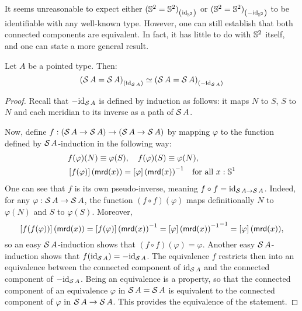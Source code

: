 \documentclass[english,a4]{article}
\renewcommand{\ap}[1]{\left[{#1}\right]}
\begin{document}
It seems unreasonable to expect either ${({{\mathbb S^{2}}} = {{\mathbb S^{2}}})}_{\left(\mathord{\mathrm{id}}_{{\mathbb S^{2}}}\right)}$ or
${({{\mathbb S^{2}}} = {{\mathbb S^{2}}})}_{\left(-\mathord{\mathrm{id}}_{{\mathbb S^{2}}}\right)}$ to be identifiable with any well-known type.
However, one can still establish that both connected components are equivalent.
In fact, it has little to do with ${{\mathbb S^{2}}}$ itself, and one can state a more
general result.
\begin{proposition} \label{prop:equiv-susp-comp}
  Let $A$ be a pointed type. Then:
  \begin{displaymath}
    {(\operatorname{\mathcal S}A = \operatorname{\mathcal S}A)}_{\left(\mathord{\mathrm{id}}_{\operatorname{\mathcal S} A}\right)} \simeq {(\operatorname{\mathcal S}A = \operatorname{\mathcal S}A)}_{\left(-\mathord{\mathrm{id}}_{\operatorname{\mathcal S} A}\right)}
  \end{displaymath}
  \label{prop:sups-components-are-equiv}
\end{proposition}
\begin{proof}
  Recall that $-\mathord{\mathrm{id}}_{\operatorname{\mathcal S} A}$ is defined by induction as follows: it maps $N$
  to $S$, $S$ to $N$ and each meridian to its inverse as a path of $\operatorname{\mathcal S} A$.

  Now, define $f:{({\operatorname{\mathcal S} A} \to {\operatorname{\mathcal S}A})} \to ({\operatorname{\mathcal S} A} \to {\operatorname{\mathcal S}A})$ by mapping
  $\varphi$ to the function defined by ${\operatorname{\mathcal S} A}$-induction in the following way:
  \begin{align*}
    &f(\varphi)(N) \jdeq \varphi(S), \quad f(\varphi)(S) \jdeq \varphi(N),\\
    &\ap{f(\varphi)}(\mrd(x)) = \inv{\ap{\varphi}(\mrd(x))}\quad \text{for all}\ x:\Sc
  \end{align*}
  One can see that $f$ is its own pseudo-inverse, meaning $f\circ f = \mathord{\mathrm{id}}_{{\operatorname{\mathcal S} A}
  \to {\operatorname{\mathcal S}A}}$. Indeed, for any $\varphi:{\operatorname{\mathcal S} A} \to {\operatorname{\mathcal S}A}$, the function $(f\circ
  f)(\varphi)$ maps definitionally $N$ to $\varphi(N)$ and $S$ to $\varphi(S)$.
  Moreover, 
  \[
  \ap{f(f(\varphi))}(\mrd(x)) = \inv{\ap{f(\varphi)}(\mrd(x))}
  = \inv{\inv{\ap{\varphi}(\mrd(x))}} = \ap{\varphi}(\mrd(x)),
  \]
  so an easy ${\operatorname{\mathcal S} A}$-induction shows that $(f\circ f)(\varphi) = \varphi$.
  Another easy ${\operatorname{\mathcal S} A}$-induction shows that $f(\mathord{\mathrm{id}}_{\operatorname{\mathcal S} A}) = -\mathord{\mathrm{id}}_{\operatorname{\mathcal S} A}$.
  The equivalence $f$ restricts then into an equivalence between the connected
  component of $\mathord{\mathrm{id}}_{\operatorname{\mathcal S} A}$ and the connected component of $-\mathord{\mathrm{id}}_{\operatorname{\mathcal S} A}$. 
  Being an equivalence is a property, so that the connected component of an
  equivalence $\varphi$ in $\operatorname{\mathcal S} A = \operatorname{\mathcal S} A$ is equivalent to the connected
  component of $\varphi$ in ${\operatorname{\mathcal S} A} \to {\operatorname{\mathcal S}A}$. This provides the
  equivalence of the statement.
\end{proof}
\end{document}

